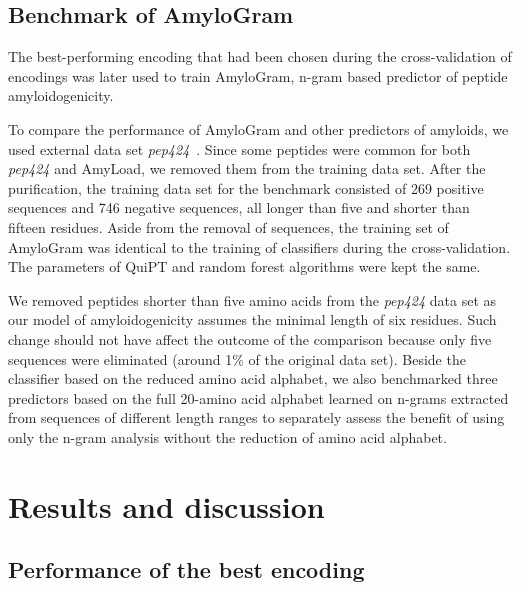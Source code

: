\documentclass[fleqn,10pt,twoside]{gcb15submission}
\begin{document}
\subsection{Benchmark of AmyloGram}

The best-performing encoding that had been chosen during the cross-validation of 
encodings was later used to train AmyloGram, n-gram based predictor of peptide 
amyloidogenicity.

  To compare the performance of AmyloGram and other predictors of amyloids, we 
used external data set \textit{pep424}~\citep{walsh_pasta_2014}. Since some 
peptides were common for both \textit{pep424} and AmyLoad, we removed them from 
the training data set. After the purification, the training data set for the 
benchmark consisted of 269 positive sequences and 746 negative sequences, all 
longer than five and shorter than fifteen residues. Aside from the removal of 
sequences, the training set of AmyloGram was identical to the training of 
classifiers during the cross-validation. The parameters of QuiPT and random 
forest algorithms were kept the same. 

  We removed peptides shorter than five amino acids from the \textit{pep424} 
data set as our model of amyloidogenicity assumes the minimal length of six 
residues. Such change should not have affect the outcome of the comparison 
because only five sequences were eliminated (around 1\% of the original data 
set). Beside the classifier based on the reduced amino acid alphabet, we also 
benchmarked three predictors based on the full 20-amino acid alphabet learned on 
n-grams extracted from sequences of different length ranges to separately assess 
the benefit of using only the n-gram analysis without the reduction of amino 
acid alphabet.

\section{Results and discussion}


\subsection{Performance of the best encoding}
\end{document}
